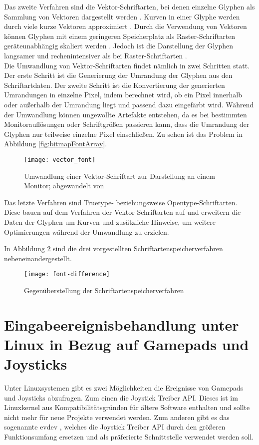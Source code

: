 Das zweite Verfahren sind die Vektor-Schriftarten, bei denen einzelne Glyphen als Sammlung von Vektoren dargestellt werden \cites{microsoftFonts}. Kurven in einer Glyphe werden durch viele kurze Vektoren approximiert \cite[S.~24]{hersheyFont}. Durch die Verwendung von Vektoren können Glyphen mit einem geringeren Speicherplatz als Raster-Schriftarten geräteunabhängig skaliert werden \cites{strizverFont}{microsoftFonts}. Jedoch ist die Darstellung der Glyphen langsamer und rechenintensiver als bei Raster-Schriftarten \cites{microsoftFonts}{microsoftTrueType}.\\
Die Umwandlung von Vektor-Schriftarten findet nämlich in zwei Schritten statt. Der erste Schritt ist die Generierung der Umrandung der Glyphen aus den Schriftartdaten. Der zweite Schritt ist die Konvertierung der generierten Umrandungen in einzelne Pixel, indem berechnet wird, ob ein Pixel innerhalb oder außerhalb der Umrandung liegt und passend dazu eingefärbt wird. \cite{strizverFont}
Während der Umwandlung können ungewollte Artefakte entstehen, da es bei bestimmten Monitorauflösungen oder Schriftgrößen passieren kann, dass die Umrandung der Glyphen nur teilweise einzelne Pixel einschließen. Zu sehen ist das Problem in Abbildung \ref{fig:bitmapFontArray}.

\begin{figure}[h]
    \centering
    \texttt{[image: vector\_font]}
    \caption{Umwandlung einer Vektor-Schriftart zur Darstellung an einem Monitor; abgewandelt von \cite{strizverFont}}
    \label{fig:vectorFont}
\end{figure}

Das letzte Verfahren sind Truetype- beziehungsweise Opentype-Schriftarten. Diese bauen auf dem Verfahren der Vektor-Schriftarten auf und erweitern die Daten der Glyphen um Kurven und zusätzliche Hinweise, um weitere Optimierungen während der Umwandlung zu erzielen. \cite{microsoftFonts}

In Abbildung \ref{fig:fontDifference} sind die drei vorgestellten Schriftartenspeicherverfahren nebeneinandergestellt.

\begin{figure}[h]
    \centering
    \texttt{[image: font-difference]}
    \caption{Gegenüberstellung der Schriftartenspeicherverfahren}
    \label{fig:fontDifference}
\end{figure}

\section{Eingabeereignisbehandlung unter Linux in Bezug auf Gamepads und Joysticks}
Unter Linuxsystemen gibt es zwei Möglichkeiten die Ereignisse von Gamepads und Joysticks abzufragen. Zum einen die Joystick Treiber \ac{API}. Dieses ist im Linuxkernel aus Kompatibilitätsgründen für ältere Software enthalten und sollte nicht mehr für neue Projekte verwendet werden. Zum anderen gibt es das sogenannte \ac{evdev} \cite{pavlikInput}, welches die Joystick Treiber \ac{API} durch den größeren Funktionsumfang ersetzen und als präferierte Schnittstelle verwendet werden soll. \cites{ragnarJoystick}{pavlikUserspaceAPI}

